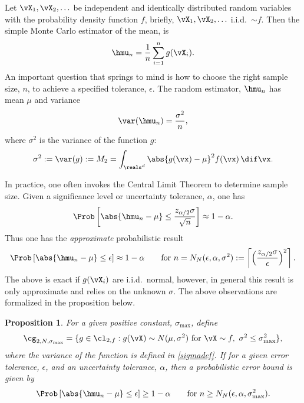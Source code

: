 \documentclass[12pt]{amsart}
\newtheorem{prop}[theorem]{Proposition}
\begin{document}
Let $\vX_1, \vX_2, \ldots$ be independent and identically distributed random variables with the probability density function $f$, briefly, $\vX_1, \vX_2, \ldots$ i.i.d.\ $\sim f$.  Then the simple Monte Carlo estimator of the mean, is
\begin{equation} \label{simpleMCest}
\hmu_n = \frac 1n \sum_{i=1}^n g(\vX_i).
\end{equation}
An important question that springs to mind is how to choose the right sample size, $n$, to achieve a specified tolerance, $\epsilon$.  The random estimator, $\hmu_n$ has mean $\mu$ and variance
\begin{equation*}
\var(\hmu_n) = \frac{\sigma^2}{n},
\end{equation*}
where $\sigma^2$ is the variance of the function $g$:
\begin{equation} \label{sigmadef}
\sigma^2 := \var(g) := M_2 = \int_{\reals^d} \abs{g(\vx)-\mu}^2 f(\vx) \, \dif \vx.
\end{equation}

In practice, one often invokes the Central Limit Theorem to determine sample size. Given a significance level or uncertainty tolerance, $\alpha$, one has
\[
\Prob\left[\abs{\hmu_n-\mu} \le \frac{z_{\alpha/2} \sigma}{\sqrt{n}} \right] \approx 1-\alpha.
\]
Thus one has the \emph{approximate} probabilistic result
\begin{equation} \label{CLTerr}
\Prob\left[\abs{\hmu_n-\mu} \le \epsilon \right] \approx 1-\alpha \qquad \text{for } n=N_{N}(\epsilon,\alpha,\sigma^2) :=\left \lceil \left(\frac{z_{\alpha/2}\sigma}{\epsilon}\right)^2 \right \rceil.
\end{equation}
The above is exact if $g(\vX_i)$ are i.i.d.\ normal, however, in general this result is only approximate and relies on the unknown $\sigma$.  The above observations are formalized in the proposition below.

\begin{prop} \label{nonadaptnormprop} For a given positive constant, $\sigma_{\max}$, define
\[
\cg_{2,N,\sigma_{\max}}= \{g \in \cl_{2,f} : g(\vX) \sim N(\mu,\sigma^2) \text{ for }\vX \sim f, \ \sigma^2 \le \sigma^2_{\max} \},
\]
where the variance of the function is defined in \eqref{sigmadef}.  If for a given error tolerance, $\epsilon$, and an uncertainty tolerance, $\alpha$, then a probabilistic error bound is given by
\[
\Prob\left[\abs{\hmu_n-\mu} \le \epsilon \right] \ge 1-\alpha \qquad \text{for } n \ge N_{N}(\epsilon,\alpha,\sigma_{\max}^2).
\]
\end{prop}
\end{document}
